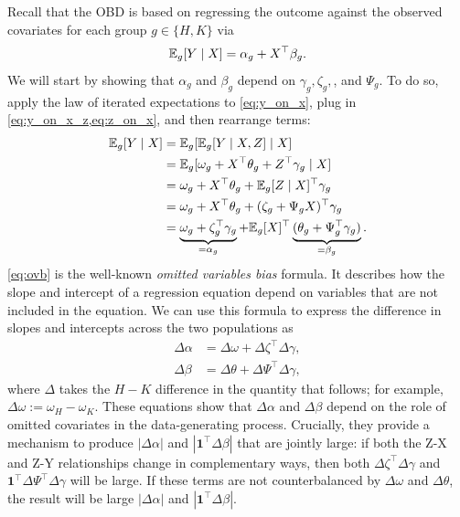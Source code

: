 Recall that the OBD is based on regressing the outcome against the observed covariates for each group \(g \in \{H, K\}\) via
\begin{align}
    \label{eq:y_on_x}    
    \mathbb{E}_g[Y \mid X] = \alpha_g + X^\top \beta_g.
\end{align}
We will start by showing that \( \alpha_g \) and \( \beta_g \) depend on \( \gamma_g, \zeta_g, \), and \( \Psi_g \). 
To do so, apply the law of iterated expectations to \cref{eq:y_on_x}, plug in \cref{eq:y_on_x_z,eq:z_on_x}, and then rearrange terms:
\begin{align}    
    \mathbb{E}_g[Y \mid X] 
    &= \mathbb{E}_g[ \mathbb{E}_g[Y \mid X, Z] \mid X ] \nonumber \\
    &= \mathbb{E}_g[ \omega_g + X^\top \theta_g + Z^\top \gamma_g \mid X ] \nonumber  \\
    &= \omega_g + X^\top \theta_g + \mathbb{E}_g[Z \mid X]^\top \gamma_g \nonumber \\
    &= \omega_g + X^\top \theta_g + (\zeta_g + \Psi_g X)^\top \gamma_g \nonumber \\ 
    \label{eq:ovb}
    &= \underbrace{\omega_g + \zeta_g^\top \gamma_g}_{=\alpha_g} + \mathbb{E}_g[X]^\top \underbrace{(\theta_g + \Psi_g^\top \gamma_g)}_{=\beta_g}.
\end{align}
\cref{eq:ovb} is the well-known \textit{omitted variables bias} formula.
It describes how the slope and intercept of a regression equation depend on variables that are not included in the equation.
We can use this formula to express the difference in slopes and intercepts across the two populations as 
\begin{align}  
  \label{eq:delta_alpha_gamma}
  \Delta \alpha &= \Delta \omega + \Delta \zeta^\top \Delta \gamma,  \\
  \label{eq:delta_beta_gamma}
  \Delta \beta  &= \Delta \theta + \Delta \Psi^\top \Delta \gamma,
\end{align}
where \( \Delta \) takes the $H-K$ difference in the quantity that follows; for example, \( \Delta \omega := \omega_H - \omega_K \).
These equations show that \( \Delta \alpha \) and \( \Delta \beta \) depend on the role of omitted covariates in the data-generating process.
Crucially, they provide a mechanism to produce \( | \Delta \alpha | \) and \( | \mathbf{1}^\top \Delta \beta | \) that are jointly large:
if both the Z-X and Z-Y relationships change in complementary ways, then both \( \Delta \zeta^\top \Delta \gamma \) and \( \mathbf{1}^\top \Delta \Psi^\top \Delta \gamma \) will be large. 
If these terms are not counterbalanced by \( \Delta \omega \) and \( \Delta \theta \), the result will be large \( | \Delta \alpha | \) and \( | \mathbf{1}^\top \Delta \beta | \).


